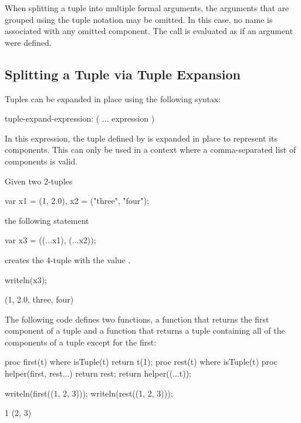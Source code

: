 When splitting a tuple into multiple formal arguments, the arguments
that are grouped using the tuple notation may be omitted.  In this
case, no name is associated with any omitted component.  The
call is evaluated as if an argument were defined.

\subsection{Splitting a Tuple via Tuple Expansion}
\label{Tuple_Expansion}

Tuples can be expanded in place using the following syntax:
\begin{syntax}
tuple-expand-expression:
  ( ... expression )
\end{syntax}
In this expression, the tuple defined by  is expanded
in place to represent its components.  This can only be used in a
context where a comma-separated list of components is valid.

\begin{example}
\begin{chapelpre}
\end{chapelpre}
Given two 2-tuples
\begin{chapel}
var x1 = (1, 2.0), x2 = ("three", "four");
\end{chapel}
the following statement
\begin{chapel}
var x3 = ((...x1), (...x2));
\end{chapel}
creates the 4-tuple  with the value .
\begin{chapelpost}
writeln(x3);
\end{chapelpost}
\begin{chapeloutput}
(1, 2.0, three, four)
\end{chapeloutput}
\end{example}

\begin{example}
\begin{chapelpre}
\end{chapelpre}
The following code defines two functions, a function  that
returns the first component of a tuple and a function  that
returns a tuple containing all of the components of a tuple except for
the first:
\begin{chapel}
proc first(t) where isTuple(t) {
  return t(1);
}
proc rest(t) where isTuple(t) {
  proc helper(first, rest...)
    return rest;
  return helper((...t));
}
\end{chapel}
\begin{chapelpost}
writeln(first((1, 2, 3)));
writeln(rest((1, 2, 3)));
\end{chapelpost}
\begin{chapeloutput}
1
(2, 3)
\end{chapeloutput}
\end{example}

